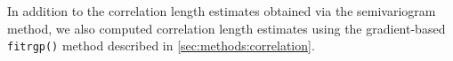 \documentclass[final,twocolumn,12pt]{elsarticle}
\begin{document}
	
	In addition to the correlation length estimates obtained via the semivariogram method, we also computed correlation length estimates using the gradient-based \texttt{fitrgp()} method described in \cref{sec:methods:correlation}.
	
\end{document}
